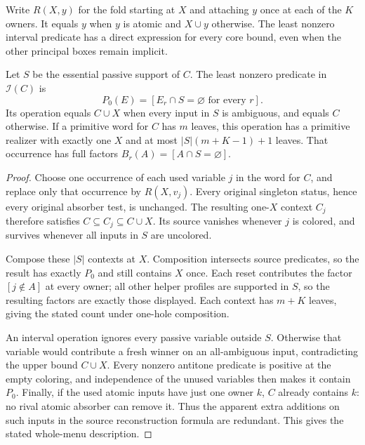 Write $R(X,y)$ for the fold starting at $X$ and attaching $y$ once
at each of the $K$ owners. It equals $y$ when $y$ is atomic and
$X\cup y$ otherwise. The least nonzero interval predicate has a direct
expression for every core bound, even when the other principal boxes
remain implicit.

\begin{proposition}
\label{core:prop:least-source-extension}
Let $S$ be the essential passive support of $C$. The least nonzero
predicate in $\mathcal I(C)$ is
\[
 P_0(E)=[E_r\cap S=\varnothing\text{ for every }r].
\]
Its operation equals $C\cup X$ when every input in $S$ is ambiguous,
and equals $C$ otherwise. If a primitive word for $C$ has $m$ leaves,
this operation has a primitive realizer with exactly one $X$ and at
most $|S|(m+K-1)+1$ leaves. That occurrence has full factors
$B_r(A)=[A\cap S=\varnothing]$.
\end{proposition}
\begin{proof}
Choose one occurrence of each used variable $j$ in the word for $C$,
and replace only that occurrence by $R(X,v_j)$.
Every original singleton status, hence every original absorber test,
is unchanged. The resulting one-$X$ context $C_j$ therefore satisfies
$C\subseteq C_j\subseteq C\cup X$.
Its source vanishes whenever $j$ is colored, and survives whenever
all inputs in $S$ are uncolored.

Compose these $|S|$ contexts at $X$. Composition intersects source
predicates, so the result has exactly $P_0$ and still contains $X$
once. Each reset contributes the factor $[j\notin A]$ at every owner;
all other helper profiles are supported in $S$, so the resulting
factors are exactly those displayed. Each context has $m+K$ leaves,
giving the stated count under one-hole composition.

An interval operation ignores every passive variable outside $S$.
Otherwise that variable would contribute a fresh winner on an
all-ambiguous input, contradicting the upper bound $C\cup X$.
Every nonzero antitone predicate is positive at the empty coloring,
and independence of the unused variables then makes it contain $P_0$.
Finally, if the used atomic inputs have just one owner $k$, $C$
already contains $k$: no rival atomic absorber can remove it.
Thus the apparent extra additions on such inputs in the source
reconstruction formula are redundant. This gives the stated
whole-menu description.
\end{proof}

